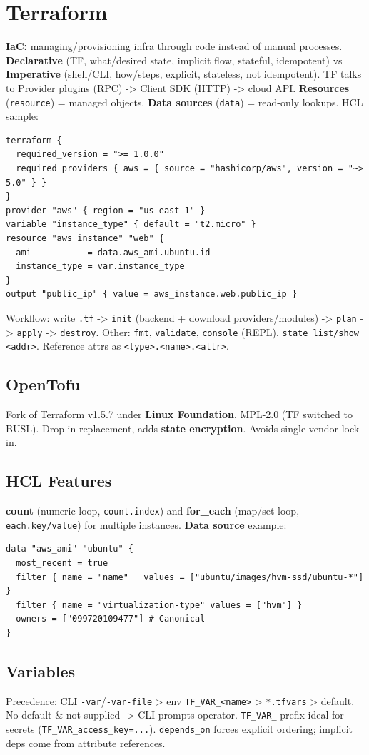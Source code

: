 \renewcommand{\chapcolor}{chTerraform}
\section{Terraform}
\textbf{IaC:} managing/provisioning infra through code instead of manual processes. \textbf{Declarative} (TF, what/desired state, implicit flow, stateful, idempotent) vs \textbf{Imperative} (shell/CLI, how/steps, explicit, stateless, not idempotent). TF talks to Provider plugins (RPC) -> Client SDK (HTTP) -> cloud API. \textbf{Resources} (\texttt{resource}) = managed objects. \textbf{Data sources} (\texttt{data}) = read-only lookups. HCL sample:
\begin{lstlisting}[language=hcl]
terraform {
  required_version = ">= 1.0.0"
  required_providers { aws = { source = "hashicorp/aws", version = "~> 5.0" } }
}
provider "aws" { region = "us-east-1" }
variable "instance_type" { default = "t2.micro" }
resource "aws_instance" "web" {
  ami           = data.aws_ami.ubuntu.id
  instance_type = var.instance_type
}
output "public_ip" { value = aws_instance.web.public_ip }
\end{lstlisting}
Workflow: write \texttt{.tf} -> \texttt{init} (backend + download providers/modules) -> \texttt{plan} -> \texttt{apply} -> \texttt{destroy}. Other: \texttt{fmt}, \texttt{validate}, \texttt{console} (REPL), \texttt{state list/show <addr>}. Reference attrs as \texttt{<type>.<name>.<attr>}.
\subsection{OpenTofu}
Fork of Terraform v1.5.7 under \textbf{Linux Foundation}, MPL-2.0 (TF switched to BUSL). Drop-in replacement, adds \textbf{state encryption}. Avoids single-vendor lock-in.
\subsection{HCL Features}
\textbf{count} (numeric loop, \texttt{count.index}) and \textbf{for\_each} (map/set loop, \texttt{each.key/value}) for multiple instances. \textbf{Data source} example:
\begin{lstlisting}[language=hcl]
data "aws_ami" "ubuntu" {
  most_recent = true
  filter { name = "name"   values = ["ubuntu/images/hvm-ssd/ubuntu-*"] }
  filter { name = "virtualization-type" values = ["hvm"] }
  owners = ["099720109477"] # Canonical
}
\end{lstlisting}
\subsection{Variables}
Precedence: CLI \texttt{-var}/\texttt{-var-file} > env \texttt{TF\_VAR\_<name>} > \texttt{*.tfvars} > default. No default \& not supplied -> CLI prompts operator. \texttt{TF\_VAR\_} prefix ideal for secrets (\texttt{TF\_VAR\_access\_key=...}). \texttt{depends\_on} forces explicit ordering; implicit deps come from attribute references.
